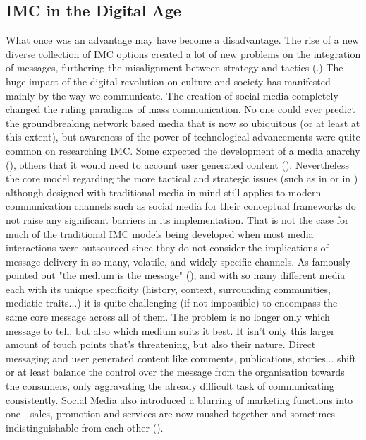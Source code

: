 \documentclass[12pt]{article}
\begin{document}
 \subsection{IMC in the Digital Age}\label{digitalage}
 
What once was an advantage may have become a disadvantage. The rise of a new diverse collection of IMC options created a lot of new problems on the integration of messages, furthering the misalignment between strategy and tactics (\cite{holm}.) The huge impact of the digital revolution on culture and society has manifested mainly by the way we communicate. The creation of social media completely changed the ruling paradigms of mass communication. No one could ever predict the groundbreaking network based media that is now so ubiquitous (or at least at this extent), but awareness of the power of technological advancements were quite common on researching IMC. Some expected the development of a media anarchy (\cite{solomon}), others that it would need to account user generated content (\cite{ananda}). Nevertheless the core model regarding the more tactical and strategic issues (such as \citeauthor{schultz} in \citeyear{schultz} or \citeauthor{duncan} in \citeyear{duncan}) although designed with traditional media in mind still applies to modern communication channels such as social media for their conceptual frameworks do not raise any significant barriers in its implementation. That is not the case for much of the traditional IMC models being developed when most media interactions were outsourced since they do not consider the implications of message delivery in so many, volatile, and widely specific channels. As \citeauthor{mcluhan} famously pointed out "the medium is the message" (\citeyear{mcluhan}), and with so many different media each with its unique specificity (history, context, surrounding communities, mediatic traits...) it is quite challenging (if not impossible) to encompass the same core message across all of them. The problem is no longer only which message to tell, but also which medium suits it best. It isn't only this larger amount of touch points that's threatening, but also their nature. Direct messaging and user generated content like comments, publications, stories... shift or at least balance the control over the message from the organisation towards the consumers, only aggravating the already difficult task of communicating consistently. Social Media also introduced a blurring of marketing functions into one - sales, promotion and services are now mushed together and sometimes indistinguishable from each other (\cite{valos}).  
\end{document}
